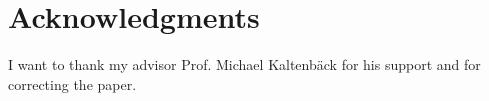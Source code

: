 \section{Acknowledgments}
I want to thank my advisor Prof. Michael Kaltenbäck for his support and for correcting the paper. 
